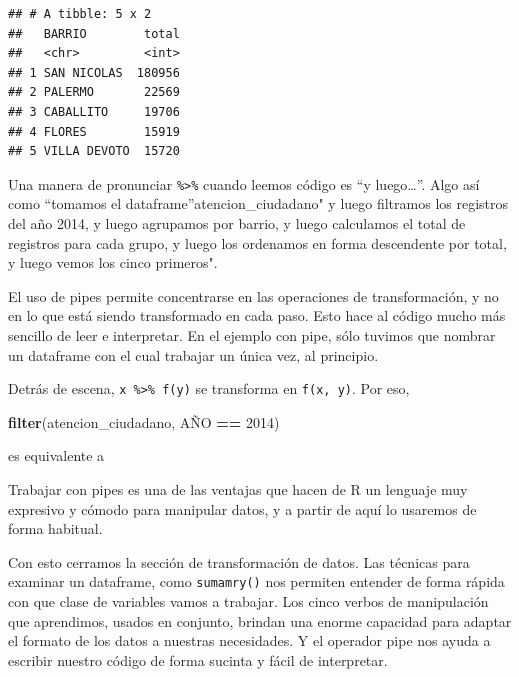 \documentclass[spanish,]{book}
\newenvironment{Shaded}{\begin{snugshade}}{\end{snugshade}}
\newcommand{\DecValTok}[1]{\textcolor[rgb]{0.00,0.00,0.81}{#1}}
\newcommand{\KeywordTok}[1]{\textcolor[rgb]{0.13,0.29,0.53}{\textbf{#1}}}
\newcommand{\NormalTok}[1]{#1}
\newcommand{\OperatorTok}[1]{\textcolor[rgb]{0.81,0.36,0.00}{\textbf{#1}}}
\newcommand{\StringTok}[1]{\textcolor[rgb]{0.31,0.60,0.02}{#1}}
\begin{document}
\begin{verbatim}
## # A tibble: 5 x 2
##   BARRIO        total
##   <chr>         <int>
## 1 SAN NICOLAS  180956
## 2 PALERMO       22569
## 3 CABALLITO     19706
## 4 FLORES        15919
## 5 VILLA DEVOTO  15720
\end{verbatim}

Una manera de pronunciar \texttt{\%\textgreater{}\%} cuando leemos código es ``y luego\ldots{}''. Algo así como ``tomamos el dataframe''atencion\_ciudadano" y luego filtramos los registros del año 2014, y luego agrupamos por barrio, y luego calculamos el total de registros para cada grupo, y luego los ordenamos en forma descendente por total, y luego vemos los cinco primeros".

El uso de pipes permite concentrarse en las operaciones de transformación, y no en lo que está siendo transformado en cada paso. Esto hace al código mucho más sencillo de leer e interpretar. En el ejemplo con pipe, sólo tuvimos que nombrar un dataframe con el cual trabajar un única vez, al principio.

Detrás de escena, \texttt{x\ \%\textgreater{}\%\ f(y)} se transforma en \texttt{f(x,\ y)}. Por eso,

\begin{Shaded}
\begin{Highlighting}[]
\KeywordTok{filter}\NormalTok{(atencion_ciudadano, AÑO }\OperatorTok{==}\StringTok{ }\DecValTok{2014}\NormalTok{)}
\end{Highlighting}
\end{Shaded}

es equivalente a

\begin{Shaded}
\end{Shaded}

Trabajar con pipes es una de las ventajas que hacen de R un lenguaje muy expresivo y cómodo para manipular datos, y a partir de aquí lo usaremos de forma habitual.

Con esto cerramos la sección de transformación de datos. Las técnicas para examinar un dataframe, como \texttt{sumamry()} nos permiten entender de forma rápida con que clase de variables vamos a trabajar. Los cinco verbos de manipulación que aprendimos, usados en conjunto, brindan una enorme capacidad para adaptar el formato de los datos a nuestras necesidades. Y el operador pipe nos ayuda a escribir nuestro código de forma sucinta y fácil de interpretar.
\end{document}
